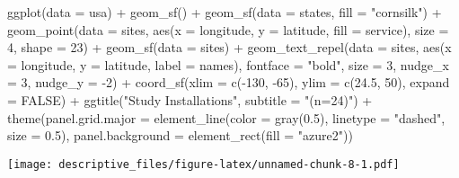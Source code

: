 \documentclass[
]{article}
\newenvironment{Shaded}{\begin{snugshade}}{\end{snugshade}}
\newcommand{\AttributeTok}[1]{\textcolor[rgb]{0.77,0.63,0.00}{#1}}
\newcommand{\ConstantTok}[1]{\textcolor[rgb]{0.00,0.00,0.00}{#1}}
\newcommand{\DecValTok}[1]{\textcolor[rgb]{0.00,0.00,0.81}{#1}}
\newcommand{\FloatTok}[1]{\textcolor[rgb]{0.00,0.00,0.81}{#1}}
\newcommand{\FunctionTok}[1]{\textcolor[rgb]{0.00,0.00,0.00}{#1}}
\newcommand{\NormalTok}[1]{#1}
\newcommand{\SpecialCharTok}[1]{\textcolor[rgb]{0.00,0.00,0.00}{#1}}
\newcommand{\StringTok}[1]{\textcolor[rgb]{0.31,0.60,0.02}{#1}}
\begin{document}
\begin{Shaded}
\begin{Highlighting}[]
\FunctionTok{ggplot}\NormalTok{(}\AttributeTok{data =}\NormalTok{ usa) }\SpecialCharTok{+}
    \FunctionTok{geom\_sf}\NormalTok{() }\SpecialCharTok{+}
    \FunctionTok{geom\_sf}\NormalTok{(}\AttributeTok{data =}\NormalTok{ states, }\AttributeTok{fill =} \StringTok{"cornsilk"}\NormalTok{) }\SpecialCharTok{+} 
    \FunctionTok{geom\_point}\NormalTok{(}\AttributeTok{data =}\NormalTok{ sites, }\FunctionTok{aes}\NormalTok{(}\AttributeTok{x =}\NormalTok{ longitude, }\AttributeTok{y =}\NormalTok{ latitude, }\AttributeTok{fill =}\NormalTok{ service), }\AttributeTok{size =} \DecValTok{4}\NormalTok{, }
        \AttributeTok{shape =} \DecValTok{23}\NormalTok{) }\SpecialCharTok{+}
    \FunctionTok{geom\_sf}\NormalTok{(}\AttributeTok{data =}\NormalTok{ sites) }\SpecialCharTok{+}
    \FunctionTok{geom\_text\_repel}\NormalTok{(}\AttributeTok{data =}\NormalTok{ sites, }\FunctionTok{aes}\NormalTok{(}\AttributeTok{x =}\NormalTok{ longitude, }\AttributeTok{y =}\NormalTok{ latitude, }\AttributeTok{label =}\NormalTok{ names), }\AttributeTok{fontface =} \StringTok{"bold"}\NormalTok{, }\AttributeTok{size =} \DecValTok{3}\NormalTok{, }
        \AttributeTok{nudge\_x =} \DecValTok{3}\NormalTok{, }\AttributeTok{nudge\_y =} \SpecialCharTok{{-}}\DecValTok{2}\NormalTok{) }\SpecialCharTok{+}
    \FunctionTok{coord\_sf}\NormalTok{(}\AttributeTok{xlim =} \FunctionTok{c}\NormalTok{(}\SpecialCharTok{{-}}\DecValTok{130}\NormalTok{, }\SpecialCharTok{{-}}\DecValTok{65}\NormalTok{), }\AttributeTok{ylim =} \FunctionTok{c}\NormalTok{(}\FloatTok{24.5}\NormalTok{, }\DecValTok{50}\NormalTok{), }\AttributeTok{expand =} \ConstantTok{FALSE}\NormalTok{) }\SpecialCharTok{+}
    \FunctionTok{ggtitle}\NormalTok{(}\StringTok{"Study Installations"}\NormalTok{, }\AttributeTok{subtitle =} \StringTok{"(n=24)"}\NormalTok{) }\SpecialCharTok{+}
    \FunctionTok{theme}\NormalTok{(}\AttributeTok{panel.grid.major =} \FunctionTok{element\_line}\NormalTok{(}\AttributeTok{color =} \FunctionTok{gray}\NormalTok{(}\FloatTok{0.5}\NormalTok{), }\AttributeTok{linetype =} \StringTok{"dashed"}\NormalTok{, }
        \AttributeTok{size =} \FloatTok{0.5}\NormalTok{), }\AttributeTok{panel.background =} \FunctionTok{element\_rect}\NormalTok{(}\AttributeTok{fill =} \StringTok{"azure2"}\NormalTok{))}
\end{Highlighting}
\end{Shaded}

\texttt{[image: descriptive\_files/figure-latex/unnamed-chunk-8-1.pdf]}
\end{document}
